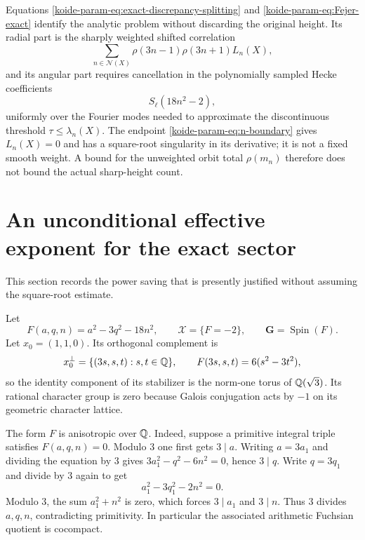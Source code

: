 Equations \eqref{koide-param-eq:exact-discrepancy-splitting} and
\eqref{koide-param-eq:Fejer-exact} identify the analytic problem without discarding
the original height.  Its radial part is the sharply weighted shifted
correlation
\begin{equation}
 \sum_{n\in\mathcal N(X)}
 \rho(3n-1)\rho(3n+1)L_n(X),
 \label{koide-param-eq:radial-shifted-correlation}
\end{equation}
and its angular part requires cancellation in the polynomially sampled
Hecke coefficients
\begin{equation}
 S_\ell(18n^2-2),
 \label{koide-param-eq:polynomial-Hecke-samples}
\end{equation}
uniformly over the Fourier modes needed to approximate the discontinuous
threshold $\tau\leq\lambda_n(X)$.  The endpoint
\eqref{koide-param-eq:n-boundary} gives $L_n(X)=0$ and has a square-root singularity
in its derivative; it is not a fixed smooth weight.  A bound for the
unweighted orbit total $\rho(m_n)$ therefore does not bound the actual
sharp-height count.

\section{An unconditional effective exponent for the exact sector}

This section records the power saving that is presently justified without
assuming the square-root estimate.

Let
\begin{equation}
 F(a,q,n)=a^2-3q^2-18n^2,
 \qquad
 \mathscr X=\{F=-2\},
 \qquad
 \mathbf G=\operatorname{Spin}(F).
 \label{koide-param-eq:group-variety}
\end{equation}
Let $x_0=(1,1,0)$.  Its orthogonal complement is
\begin{equation}
 x_0^\perp=\{(3s,s,t):s,t\in\mathbb Q\},
 \qquad
 F(3s,s,t)=6(s^2-3t^2),
 \label{koide-param-eq:stabilizer-complement}
\end{equation}
so the identity component of its stabilizer is the norm-one torus of
$\mathbb Q(\sqrt3)$.  Its rational character group is zero because Galois
conjugation acts by $-1$ on its geometric character lattice.

The form $F$ is anisotropic over $\mathbb Q$.  Indeed, suppose a primitive
integral triple satisfies $F(a,q,n)=0$.  Modulo $3$ one first gets
$3\mid a$.  Writing $a=3a_1$ and dividing the equation by $3$ gives
$3a_1^2-q^2-6n^2=0$, hence $3\mid q$.  Write $q=3q_1$ and divide by
$3$ again to get
\begin{equation}
 a_1^2-3q_1^2-2n^2=0.
\end{equation}
Modulo $3$, the sum $a_1^2+n^2$ is zero, which forces
$3\mid a_1$ and $3\mid n$.  Thus $3$ divides $a,q,n$, contradicting
primitivity.  In particular the associated arithmetic Fuchsian quotient
is cocompact.

